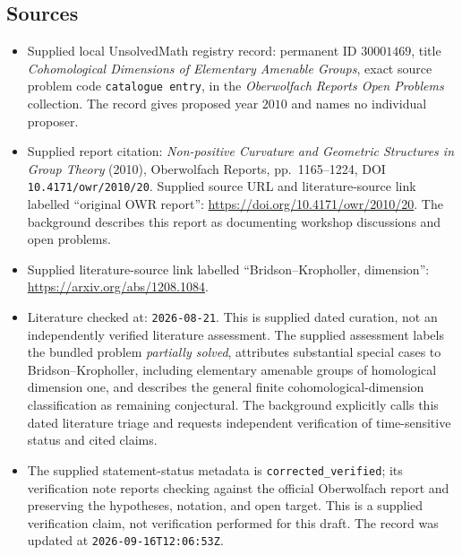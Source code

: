 \documentclass[11pt]{article}
\begin{document}
\subsection{Sources}
\begin{itemize}
\item Supplied local UnsolvedMath registry record: permanent ID \(30001469\), title \emph{Cohomological Dimensions of Elementary Amenable Groups}, exact source problem code \texttt{catalogue entry}, in the \emph{Oberwolfach Reports Open Problems} collection. The record gives proposed year \(2010\) and names no individual proposer.
\item Supplied report citation: \emph{Non-positive Curvature and Geometric Structures in Group Theory} (2010), Oberwolfach Reports, pp.\ 1165--1224, DOI \texttt{10.4171/owr/2010/20}. Supplied source URL and literature-source link labelled ``original OWR report'': \url{https://doi.org/10.4171/owr/2010/20}. The background describes this report as documenting workshop discussions and open problems.
\item Supplied literature-source link labelled ``Bridson--Kropholler, dimension'': \url{https://arxiv.org/abs/1208.1084}.
\item Literature checked at: \texttt{2026-08-21}. This is supplied dated curation, not an independently verified literature assessment. The supplied assessment labels the bundled problem \emph{partially solved}, attributes substantial special cases to Bridson--Kropholler, including elementary amenable groups of homological dimension one, and describes the general finite cohomological-dimension classification as remaining conjectural. The background explicitly calls this dated literature triage and requests independent verification of time-sensitive status and cited claims.
\item The supplied statement-status metadata is \texttt{corrected\_verified}; its verification note reports checking against the official Oberwolfach report and preserving the hypotheses, notation, and open target. This is a supplied verification claim, not verification performed for this draft. The record was updated at \texttt{2026-09-16T12:06:53Z}.
\end{itemize}
\end{document}
